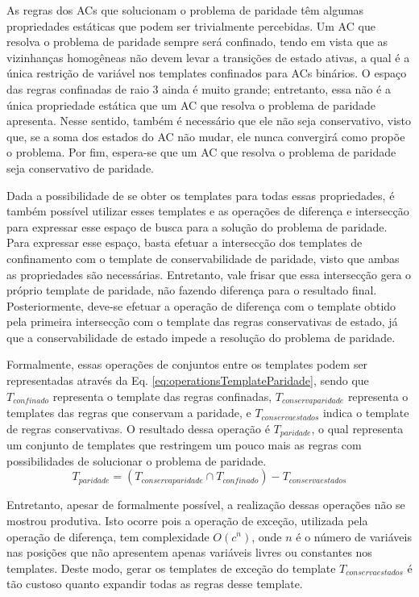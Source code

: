 As regras dos ACs que solucionam o problema de paridade têm algumas propriedades estáticas que podem ser trivialmente percebidas. 
Um AC que resolva o problema de paridade sempre será confinado, tendo em vista que as vizinhanças homogêneas não devem levar a transições de estado ativas, a qual é a única restrição de variável nos templates confinados para ACs binários. 
O espaço das regras confinadas de raio 3 ainda é muito grande; entretanto, essa não é a única propriedade estática que um AC que resolva o problema de paridade apresenta.  Nesse sentido, também é necessário que ele não seja conservativo, visto que, se a soma dos estados do AC não mudar, ele nunca convergirá como propõe o problema. 
Por fim, espera-se que um AC que resolva o problema de paridade seja conservativo de paridade.

Dada a possibilidade de se obter os templates para todas essas propriedades, é também possível utilizar esses templates e as operações de diferença e intersecção para expressar esse espaço de busca para a solução do problema de paridade.
Para expressar esse espaço, basta efetuar a intersecção dos templates de confinamento com o template de conservabilidade de paridade, visto que ambas as propriedades são necessárias. Entretanto, vale frisar que essa intersecção gera o próprio template de paridade, não fazendo diferença para o resultado final.
Posteriormente, deve-se efetuar a operação de diferença com o template obtido pela primeira intersecção com o template das regras conservativas de estado, já que a conservabilidade de estado impede a resolução do problema de paridade.

Formalmente, essas operações de conjuntos entre os templates podem ser representadas através da Eq. \eqref{eq:operationsTemplateParidade}, sendo que $T_{confinado}$ representa o template das regras confinadas, $T_{conservaparidade}$ representa o templates das regras que conservam a paridade, e ${T}_{conservaestados}$ indica o template de regras conservativas. O resultado dessa operação é $T_{paridade}$, o qual representa um conjunto de templates que restringem um pouco mais as regras com possibilidades de solucionar o problema de paridade.
\begin{equation}
T_{paridade} = (T_{conservaparidade} \cap T_{confinado}) - {T}_{conservaestados}
\label{eq:operationsTemplateParidade}
\end{equation}

Entretanto, apesar de formalmente possível, a realização dessas operações não se mostrou produtiva. Isto ocorre pois a operação de exceção, utilizada pela operação de diferença, tem complexidade $O(c^n)$, onde $n$ é o número de variáveis nas posições que não apresentem apenas variáveis livres ou constantes nos templates. Deste modo, gerar os templates de exceção do template $T_{conservaestados}$ é tão custoso quanto expandir todas as regras desse template.

